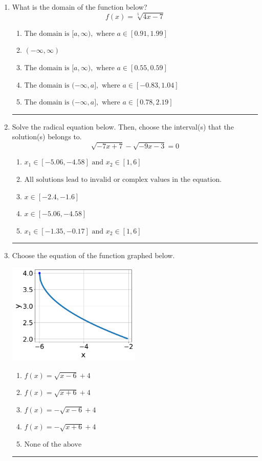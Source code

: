\documentclass[14pt]{extbook}
\newcommand{\litem}[1]{\item#1\hspace*{-1cm}\rule{\textwidth}{0.4pt}}
\begin{document}
\begin{enumerate}
{\begin{enumerate}[label=\Alph*.]
\end{enumerate} }
\litem{
What is the domain of the function below?\[ f(x) = \sqrt[5]{4 x - 7} \]\begin{enumerate}[label=\Alph*.]
\item \( \text{The domain is } [a, \infty), \text{   where } a \in [0.91, 1.99] \)
\item \( (-\infty, \infty) \)
\item \( \text{The domain is } [a, \infty), \text{   where } a \in [0.55, 0.59] \)
\item \( \text{The domain is } (-\infty, a], \text{   where } a \in [-0.83, 1.04] \)
\item \( \text{The domain is } (-\infty, a], \text{   where } a \in [0.78, 2.19] \)

\end{enumerate} }
\litem{
Solve the radical equation below. Then, choose the interval(s) that the solution(s) belongs to.\[ \sqrt{-7 x + 7} - \sqrt{-9 x - 3} = 0 \]\begin{enumerate}[label=\Alph*.]
\item \( x_1 \in [-5.06, -4.58] \text{ and } x_2 \in [1,6] \)
\item \( \text{All solutions lead to invalid or complex values in the equation.} \)
\item \( x \in [-2.4,-1.6] \)
\item \( x \in [-5.06,-4.58] \)
\item \( x_1 \in [-1.35, -0.17] \text{ and } x_2 \in [1,6] \)

\end{enumerate} }
\litem{
Choose the equation of the function graphed below.
\begin{center}
    \includegraphics[width=0.5\textwidth]{../Figures/radicalGraphToEquationCopyC.png}
\end{center}
\begin{enumerate}[label=\Alph*.]
\item \( f(x) = \sqrt{x - 6} + 4 \)
\item \( f(x) = \sqrt{x + 6} + 4 \)
\item \( f(x) = - \sqrt{x - 6} + 4 \)
\item \( f(x) = - \sqrt{x + 6} + 4 \)
\item \( \text{None of the above} \)


\end{enumerate}}
\end{enumerate}
\end{document}
